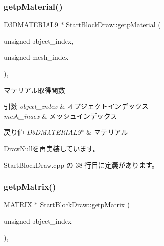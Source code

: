 \subsubsection{\texorpdfstring{getp\+Material()}{getpMaterial()}}
{\footnotesize\ttfamily D3\+D\+M\+A\+T\+E\+R\+I\+A\+L9 $\ast$ Start\+Block\+Draw\+::getp\+Material (\begin{DoxyParamCaption}\item[{unsigned}]{object\+\_\+index,  }\item[{unsigned}]{mesh\+\_\+index }\end{DoxyParamCaption})\hspace{0.3cm}{\ttfamily [override]}, {\ttfamily [virtual]}}



マテリアル取得関数 


\begin{DoxyParams}{引数}
{\em object\+\_\+index} & オブジェクトインデックス \\
\hline
{\em mesh\+\_\+index} & メッシュインデックス \\
\hline
\end{DoxyParams}

\begin{DoxyRetVals}{戻り値}
{\em D3\+D\+M\+A\+T\+E\+R\+I\+A\+L9$\ast$} & マテリアル \\
\hline
\end{DoxyRetVals}


\mbox{\hyperlink{class_draw_null_a0c1efe55fea325ad277594be6fe1e938}{Draw\+Null}}を再実装しています。



 Start\+Block\+Draw.\+cpp の 38 行目に定義があります。

\mbox{\label{class_start_block_draw_a062b7069d21ec07630f6c8aeea532401}} 
\subsubsection{\texorpdfstring{getp\+Matrix()}{getpMatrix()}}
{\footnotesize\ttfamily \mbox{\hyperlink{_matrix_8h_a032295cd9fb1b711757c90667278e744}{M\+A\+T\+R\+IX}} $\ast$ Start\+Block\+Draw\+::getp\+Matrix (\begin{DoxyParamCaption}\item[{unsigned}]{object\+\_\+index }\end{DoxyParamCaption})\hspace{0.3cm}{\ttfamily [override]}, {\ttfamily [virtual]}}



